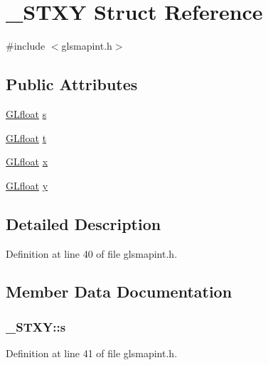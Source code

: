 \hypertarget{struct___s_t_x_y}{\section{\-\_\-\-S\-T\-X\-Y Struct Reference}
\label{struct___s_t_x_y}
}


{\ttfamily \#include $<$glsmapint.\-h$>$}

\subsection*{Public Attributes}
\begin{DoxyCompactItemize}
\item 
\hyperlink{gl_8h_a31aeedaeef29442c9c015ab355c8f5ab}{G\-Lfloat} \hyperlink{struct___s_t_x_y_abb7cf83c66ed6f8156a98985bef3a8a6}{s}
\item 
\hyperlink{gl_8h_a31aeedaeef29442c9c015ab355c8f5ab}{G\-Lfloat} \hyperlink{struct___s_t_x_y_a4abc729e77d41ab5a407b6b0b6ecb9d7}{t}
\item 
\hyperlink{gl_8h_a31aeedaeef29442c9c015ab355c8f5ab}{G\-Lfloat} \hyperlink{struct___s_t_x_y_a733147b5dc188e788b0903ba1bec7f7e}{x}
\item 
\hyperlink{gl_8h_a31aeedaeef29442c9c015ab355c8f5ab}{G\-Lfloat} \hyperlink{struct___s_t_x_y_a222822654dc08ad4e974daf39a8e4d7e}{y}
\end{DoxyCompactItemize}


\subsection{Detailed Description}


Definition at line 40 of file glsmapint.\-h.



\subsection{Member Data Documentation}
\hypertarget{struct___s_t_x_y_abb7cf83c66ed6f8156a98985bef3a8a6}{
\subsubsection[{s}]{ \-\_\-\-S\-T\-X\-Y\-::s}}\label{struct___s_t_x_y_abb7cf83c66ed6f8156a98985bef3a8a6}


Definition at line 41 of file glsmapint.\-h.

